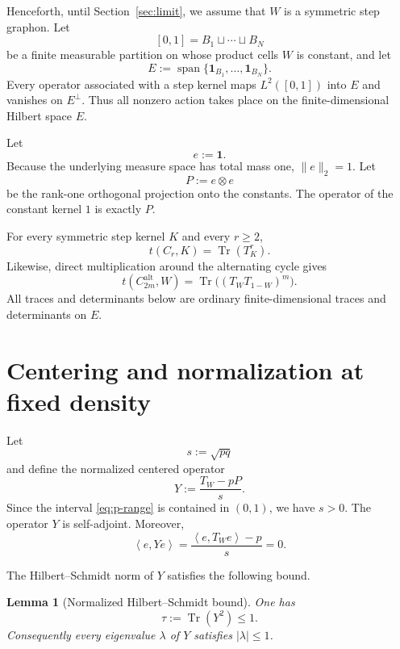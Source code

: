 \documentclass[11pt]{article}
\newtheorem{lemma}[theorem]{Lemma}
\newcommand{\one}{\mathbf{1}}
\newcommand{\ip}[2]{\left\langle #1,#2\right\rangle}
\newcommand{\Tr}{\operatorname{Tr}}
\newcommand{\Alt}{\mathrm{alt}}
\begin{document}
Henceforth, until Section~\ref{sec:limit}, we assume that $W$ is a symmetric step graphon.  Let
\[
   [0,1]=B_1\sqcup\cdots\sqcup B_N
\]
be a finite measurable partition on whose product cells $W$ is constant, and let
\[
   E:=\operatorname{span}\{\mathbf 1_{B_1},\ldots,\mathbf 1_{B_N}\}.
\]
Every operator associated with a step kernel maps $L^2([0,1])$ into $E$ and vanishes on $E^\perp$.  Thus all nonzero action takes place on the finite-dimensional Hilbert space $E$.

Let
\[
   e:=\one.
\]
Because the underlying measure space has total mass one, $\|e\|_2=1$.  Let
\[
   P:=e\otimes e
\]
be the rank-one orthogonal projection onto the constants.  The operator of the constant kernel $1$ is exactly $P$.

For every symmetric step kernel $K$ and every $r\ge2$,
\begin{equation}
   t(C_r,K)=\Tr(T_K^r).
   \label{eq:trace-cycle}
\end{equation}
Likewise, direct multiplication around the alternating cycle gives
\begin{equation}
   t(C_{2m}^{\Alt},W)
   =\Tr\bigl((T_WT_{1-W})^m\bigr).
   \label{eq:trace-alt}
\end{equation}
All traces and determinants below are ordinary finite-dimensional traces and determinants on $E$.

\section{Centering and normalization at fixed density}

Let
\[
   s:=\sqrt{pq}
\]
and define the normalized centered operator
\begin{equation}
   Y:=\frac{T_W-pP}{s}.
   \label{eq:def-Y}
\end{equation}
Since the interval \eqref{eq:p-range} is contained in $(0,1)$, we have $s>0$.  The operator $Y$ is self-adjoint.  Moreover,
\begin{equation}
   \ip{e}{Ye}
   =\frac{\ip{e}{T_We}-p}{s}
   =0.
   \label{eq:mu1zero}
\end{equation}

The Hilbert--Schmidt norm of $Y$ satisfies the following bound.

\begin{lemma}[Normalized Hilbert--Schmidt bound]\label{lem:normalized-hs-bound}
One has
\begin{equation}
   \tau:=\Tr(Y^2)\le1.
   \label{eq:tau}
\end{equation}
Consequently every eigenvalue $\lambda$ of $Y$ satisfies $|\lambda|\le1$.
\end{lemma}
\end{document}
